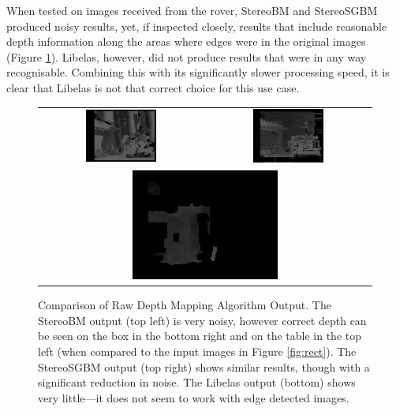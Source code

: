 When tested on images received from the rover, StereoBM and StereoSGBM produced noisy results, yet, if inspected closely, results that include reasonable depth information along the areas where edges were in the original images (Figure \ref{fig:MappingComp}). Libelas, however, did not produce results that were in any way recognisable. Combining this with its significantly slower processing speed, it is clear that Libelas is not that correct choice for this use case.

\begin{figure}[H]
    \begin{center}
    \begin{tabular}{ c c }
        \includegraphics[width=0.45\textwidth]{Figures/BMout.jpg} &
        \includegraphics[width=0.45\textwidth]{Figures/sgbmout.jpg} \\
        \multicolumn{2}{c}{\includegraphics[width=0.45\textwidth]{Figures/libelasout.jpg}}
    \end{tabular}
    \caption[Comparison of Raw Depth Mapping Algorithm Output]{Comparison of Raw Depth Mapping Algorithm Output. The StereoBM output (top left) is very noisy, however correct depth can be seen on the box in the bottom right and on the table in the top left (when compared to the input images in Figure \ref{fig:rect}). The StereoSGBM output (top right) shows similar results, though with a significant reduction in noise. The Libelas output (bottom) shows very little---it does not seem to work with edge detected images.}
    \label{fig:MappingComp}
    \end{center}
\end{figure}

